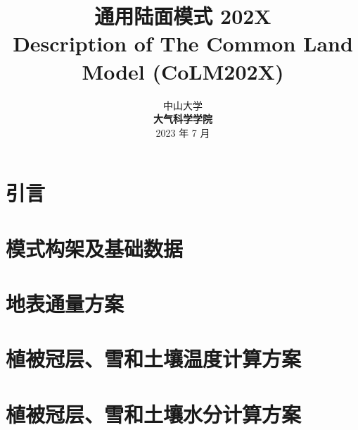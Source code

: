 \documentclass[a4paper,12pt,twoside]{report}
\begin{document}
%

\title{\huge {\bf 通用陆面模式 202X}\\[3em]
\fontsize {22}{24}
\bf{ Description of The Common Land Model (CoLM202X)}\\[3in]
\fontsize {20}{23}%
}

\author{
 \large{ 中山大学 }\\[0.1in]
 {\bf 大气科学学院}\\[1in]
 \upshape
 \large%
2023 年 7 月
}

\normallinespacing
\maketitle

\preface

%
%
%
%

\body
\part{引言}

\part{模式构架及基础数据}



\part{地表通量方案}






\part{植被冠层、雪和土壤温度计算方案}



\part{植被冠层、雪和土壤水分计算方案}

\end{document}
